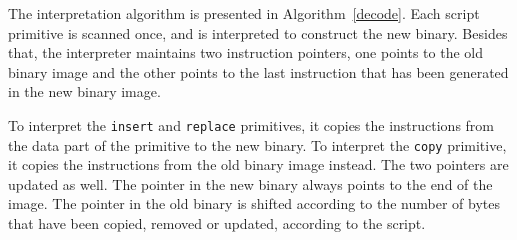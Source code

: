 The interpretation algorithm is presented in Algorithm~\ref{decode}.
Each script primitive is scanned once, and is interpreted to construct
the new binary. 
Besides that, the interpreter maintains two instruction pointers, one points to the old
binary image and the other points to the last instruction that has been generated
in the new binary image. 

To interpret the  {\tt insert} and {\tt replace} primitives, it copies the instructions from the data
part of the primitive to the new binary.  To interpret the {\tt copy} primitive, it copies
the instructions from the old binary image instead.
The two pointers are updated as well. The pointer in the new binary always
points to the end of the image. The pointer in the old binary is shifted according
to the number of bytes that have been copied, removed or updated, according to the
script.


